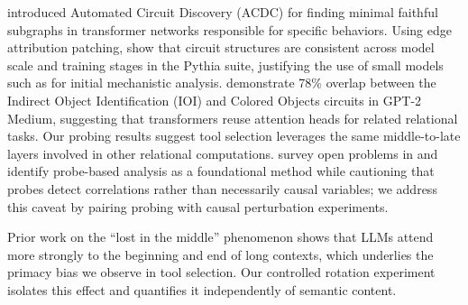 \citet{conmy2023acdc} introduced Automated Circuit Discovery (ACDC) for finding minimal
faithful subgraphs in transformer networks responsible for specific behaviors.  Using edge
attribution patching, \citet{tigges2024llm} show that circuit structures are consistent
across model scale and training stages in the Pythia suite, justifying the use of small
models such as \gpttwo for initial mechanistic analysis.  \citet{merullo2024circuit}
demonstrate 78\% overlap between the Indirect Object Identification (IOI) and Colored
Objects circuits in GPT-2 Medium, suggesting that transformers reuse attention heads for
related relational tasks.  Our probing results suggest tool selection leverages the same
middle-to-late layers involved in other relational computations.  \citet{sharkey2025open}
survey open problems in \MI and identify probe-based analysis as a foundational method
while cautioning that probes detect correlations rather than necessarily causal variables;
we address this caveat by pairing probing with causal perturbation experiments.

Prior work on the ``lost in the middle'' phenomenon \citep{liu2024lost} shows that LLMs
attend more strongly to the beginning and end of long contexts, which underlies the
primacy bias we observe in tool selection.  Our controlled rotation experiment isolates
this effect and quantifies it independently of semantic content.
